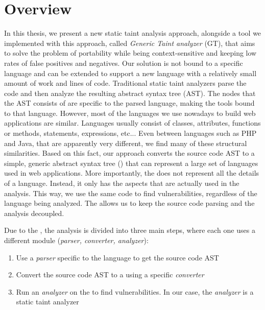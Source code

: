 \section{Overview}
In this thesis, we present a new static taint analysis approach, alongside a tool we implemented with this approach, called {\it Generic Taint analyzer} (GT), that aims to solve the problem of portability while being context-sensitive and keeping low rates of false positives and negatives. Our solution is not bound to a specific language and can be extended to support a new language with a relatively small amount of work and lines of code. 
Traditional static taint analyzers parse the code and then analyze the resulting abstract syntax tree (AST). The nodes that the AST consists of are specific to the parsed language, making the tools bound to that language. However, most of the languages we use nowadays to build web applications are similar. Languages usually consist of classes, attributes, functions or methods, statements, expressions, etc... Even between languages such as PHP and Java, that are apparently very different, we find many of these structural similarities. Based on this fact, our approach converts the source code AST to a simple, generic abstract syntax tree (\astname{}) that can represent a large set of languages used in web applications. More importantly, the \astname{} does not represent all the details of a language. Instead, it only has the aspects that are actually used in the analysis. This way, we  use the same code to find vulnerabilities, regardless of the language being analyzed. The \astname{} allows us to keep the source code parsing and the analysis decoupled.

Due to the \astname{}, the analysis is divided into three main steps, where each one uses a different module (\textit{parser, converter, analyzer}):

\begin{enumerate}
    \item Use a \textit{parser} specific to the language to get the source code AST
    \item Convert the source code AST to a \astname{} using a specific \textit{converter}

    \item Run an \textit{analyzer} on the \astname{} to find vulnerabilities. In our case, the \textit{analyzer} is a static taint analyzer
\end{enumerate}

